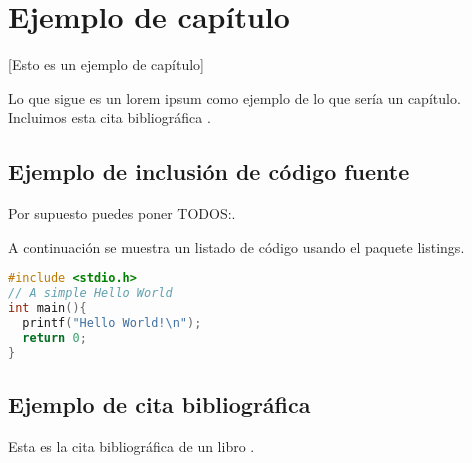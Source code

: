 \chapter{Ejemplo de capítulo}

[Esto es un ejemplo de capítulo]

Lo que sigue es un lorem ipsum como ejemplo de lo que sería un capítulo. Incluimos esta cita bibliográfica \cite{recomendaciones}.

\lipsum

\section{Ejemplo de inclusión de código fuente}

Por supuesto puedes poner TODOS:.


A continuación se muestra un listado de código usando el paquete listings.

\begin{lstlisting}[language=c]
#include <stdio.h>
// A simple Hello World
int main(){
  printf("Hello World!\n");
  return 0;
}
\end{lstlisting}


\section{Ejemplo de cita bibliográfica}

Esta es la cita bibliográfica de un libro \cite{ec}.

